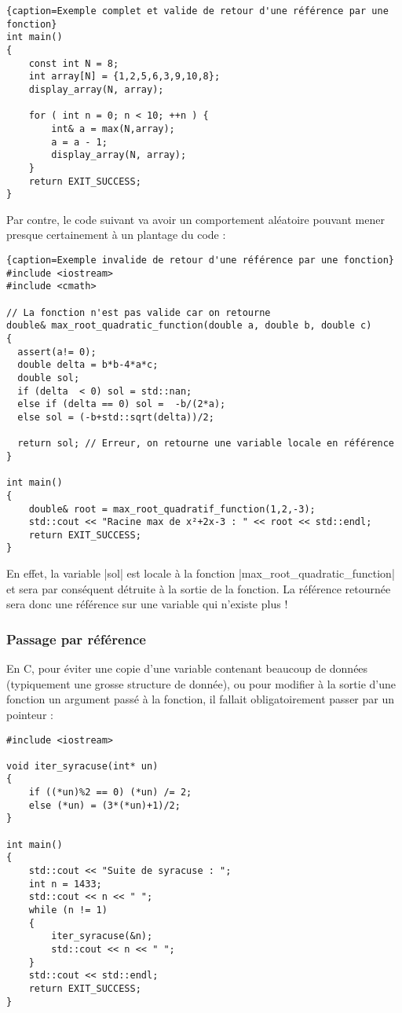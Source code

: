 \begin{itemize}
\begin{lstlisting}{caption=Exemple complet et valide de retour d'une référence par une fonction}
int main()
{
    const int N = 8;
    int array[N] = {1,2,5,6,3,9,10,8};
    display_array(N, array);

    for ( int n = 0; n < 10; ++n ) {
        int& a = max(N,array);
        a = a - 1;
        display_array(N, array);
    }
    return EXIT_SUCCESS;
}
\end{lstlisting}

Par contre, le code suivant va avoir un comportement aléatoire pouvant mener presque certainement à un plantage du code :

\begin{lstlisting}{caption=Exemple invalide de retour d'une référence par une fonction}
#include <iostream>
#include <cmath>

// La fonction n'est pas valide car on retourne 
double& max_root_quadratic_function(double a, double b, double c)
{
  assert(a!= 0);
  double delta = b*b-4*a*c;
  double sol;
  if (delta  < 0) sol = std::nan;
  else if (delta == 0) sol =  -b/(2*a);
  else sol = (-b+std::sqrt(delta))/2;

  return sol; // Erreur, on retourne une variable locale en référence
}

int main()
{
    double& root = max_root_quadratif_function(1,2,-3);
    std::cout << "Racine max de x²+2x-3 : " << root << std::endl;
    return EXIT_SUCCESS;
}
\end{lstlisting}

En effet, la variable |sol| est locale à la fonction |max\_root\_quadratic\_function| et sera par conséquent détruite à la sortie de la fonction. La référence retournée sera donc une référence sur une variable qui n'existe plus !

\subsubsection{Passage par référence}

En C, pour éviter une copie d'une variable contenant beaucoup de données (typiquement une grosse structure de donnée), ou pour modifier à la sortie d'une fonction un argument passé à la fonction, il fallait obligatoirement passer par un pointeur :

\begin{lstlisting}[caption=fonction C avec modification des arguments d'entrée]
#include <iostream>

void iter_syracuse(int* un)
{
    if ((*un)%2 == 0) (*un) /= 2;
    else (*un) = (3*(*un)+1)/2;
}

int main()
{
    std::cout << "Suite de syracuse : ";
    int n = 1433;
    std::cout << n << " ";
    while (n != 1)
    {
        iter_syracuse(&n);
        std::cout << n << " ";
    }
    std::cout << std::endl;
    return EXIT_SUCCESS;
}
\end{lstlisting}


\end{itemize}

